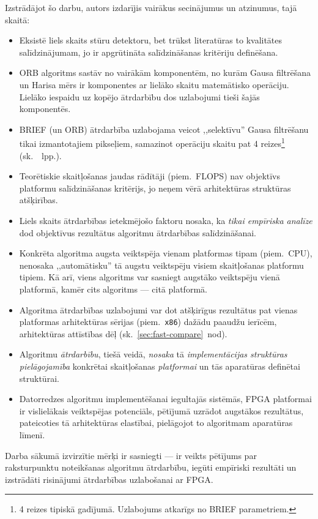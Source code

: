 Izstrādājot šo darbu, autors izdarījis vairākus secinājumus un atzinumus,
tajā skaitā:
\begin{itemize}
	\item Eksistē liels skaits stūru detektoru, bet trūkst literatūras to
		kvalitātes salīdzinājumam, jo ir apgrūtināta salīdzināšanas
		kritēriju definēšana.
	\item ORB algoritms sastāv no vairākām komponentēm, no kurām
		Gausa filtrēšana un Harisa mērs ir komponentes ar lielāko skaitu
		matemātisko operāciju. Lielāko iespaidu uz kopējo ātrdarbību dos
		uzlabojumi tieši šajās komponentēs.
	\item BRIEF (un ORB) ātrdarbība uzlabojama veicot ,,selektīvu'' Gausa
		filtrēšanu tikai izmantotajiem pikseļiem, samazinot operāciju
		skaitu pat 4 reizes\footnote{4 reizes tipiskā gadījumā. Uzlabojums atkarīgs no BRIEF parametriem.}
		(sk.~\pageref{C:selective-gauss}~lpp.).
	\item Teorētiskie skaitļošanas jaudas rādītāji (piem.~FLOPS) nav
		objektīvs platformu salīdzināšanas kritērijs, jo neņem vērā
		arhitektūras struktūras atšķirības.
	\item Liels skaits ātrdarbības ietekmējošo faktoru nosaka, ka 
		\emph{tikai empīriska analīze} dod objektīvus rezultātus
		algoritmu ātrdarbības salīdzināšanai.
	\item Konkrēta algoritma augsta veiktspēja vienam platformas tipam (piem.~CPU),
		nenosaka ,,automātisku'' tā augstu veiktspēju visiem skaitļošanas
		platformu tipiem. Kā arī, viens algoritms var sasniegt augstāko
		veiktspēju vienā platformā,
		kamēr cits algoritms --- citā platformā.
	\item Algoritma ātrdarbības uzlabojumi var dot atšķirīgus rezultātus
		pat vienas platformas arhitektūras sērijas (piem.~\texttt{x86}) 
		dažādu paaudžu ierīcēm, arhitektūras attīstības dēļ
		(sk.~\ref{sec:fast-compare}~nod).
	\item Algoritmu \emph{ātrdarbību}, tiešā veidā, \emph{nosaka} tā
		\emph{implementācijas struktūras pielāgojamība} konkrētai
		skaitļošanas \emph{platformai} un tās aparatūras definētai struktūrai.
	\item Datorredzes algoritmu implementēšanai iegultajās sistēmās, FPGA
		platformai ir vislielākais veiktspējas potenciāls, pētījumā uzrādot
		augstākos rezultātus, pateicoties tā arhitektūras elastībai,
		pielāgojot to algoritmam aparatūras līmenī.
\end{itemize}

Darba sākumā izvirzītie mērķi ir sasniegti --- ir veikts pētījums par
raksturpunktu noteikšanas algoritmu ātrdarbību, iegūti empīriski rezultāti un
izstrādāti risinājumi ātrdarbības uzlabošanai ar FPGA.
